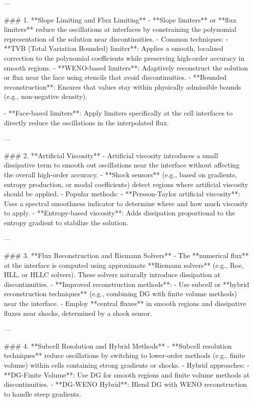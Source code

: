 ---

### 1. **Slope Limiting and Flux Limiting**
   - **Slope limiters** or **flux limiters** reduce the oscillations at interfaces by constraining the polynomial representation of the solution near discontinuities.
   - Common techniques:
     - **TVB (Total Variation Bounded) limiter**: Applies a smooth, localized correction to the polynomial coefficients while preserving high-order accuracy in smooth regions.
     - **WENO-based limiters**: Adaptively reconstruct the solution or flux near the face using stencils that avoid discontinuities.
     - **Bounded reconstruction**: Ensures that values stay within physically admissible bounds (e.g., non-negative density).

   - **Face-based limiters**: Apply limiters specifically at the cell interfaces to directly reduce the oscillations in the interpolated flux.

---

### 2. **Artificial Viscosity**
   - Artificial viscosity introduces a small dissipative term to smooth out oscillations near the interface without affecting the overall high-order accuracy.
   - **Shock sensors** (e.g., based on gradients, entropy production, or modal coefficients) detect regions where artificial viscosity should be applied.
   - Popular methods:
     - **Persson-Taylor artificial viscosity**: Uses a spectral smoothness indicator to determine where and how much viscosity to apply.
     - **Entropy-based viscosity**: Adds dissipation proportional to the entropy gradient to stabilize the solution.

---

### 3. **Flux Reconstruction and Riemann Solvers**
   - The **numerical flux** at the interface is computed using approximate **Riemann solvers** (e.g., Roe, HLL, or HLLC solvers). These solvers naturally introduce dissipation at discontinuities.
   - **Improved reconstruction methods**:
     - Use subcell or **hybrid reconstruction techniques** (e.g., combining DG with finite volume methods) near the interface.
     - Employ **central fluxes** in smooth regions and dissipative fluxes near shocks, determined by a shock sensor.

---

### 4. **Subcell Resolution and Hybrid Methods**
   - **Subcell resolution techniques** reduce oscillations by switching to lower-order methods (e.g., finite volume) within cells containing strong gradients or shocks.
   - Hybrid approaches:
     - **DG-Finite Volume**: Use DG for smooth regions and finite volume methods at discontinuities.
     - **DG-WENO Hybrid**: Blend DG with WENO reconstruction to handle steep gradients.

